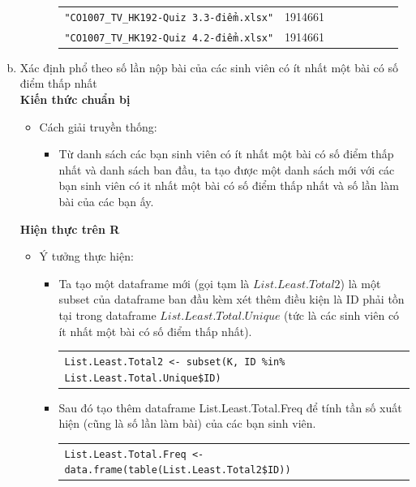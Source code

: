 \documentclass[a4paper]{article}
\theoremstyle{definition}
\begin{document}
\begin{enumerate}[a)]
\begin{itemize}
\begin{itemize}
\begin{center}
\begin{tabular}{l c c c c c c c}
                     \texttt{"CO1007\_TV\_HK192-Quiz 3.3-điểm.xlsx"} & 1914661\\
                     \texttt{"CO1007\_TV\_HK192-Quiz 4.2-điểm.xlsx"} & 1914661
                \end{tabular}
            \end{center}
        \end{itemize}
    \end{itemize}
    \bf\item {Xác định phổ theo số lần nộp bài của các sinh viên có ít nhất một bài có số điểm thấp nhất}\\[6pt]
    \bf Kiến thức chuẩn bị\normalfont
    \begin{itemize}
        \item Cách giải truyền thống:
        \begin{itemize}
            \item Từ danh sách các bạn sinh viên có ít nhất một bài có số điểm thấp nhất và danh sách ban đầu, ta tạo được một danh sách mới với các bạn sinh viên có it nhất một bài có số điểm thấp nhất và số lần làm bài của các bạn ấy.
        \end{itemize}
    \end{itemize}
    \bf Hiện thực trên R\normalfont
    \begin{itemize}
        \item Ý tưởng thực hiện:
        \begin{itemize}
            \item Ta tạo một dataframe mới (gọi tạm là $List.Least.Total2$) là một subset của dataframe ban đầu kèm xét thêm điều kiện là ID phải tồn tại trong dataframe $List.Least.Total.Unique$ (tức là các sinh viên có ít nhất một bài có số điểm thấp nhất).
            \begin{center}
                \begin{tabular}{p{13cm}}
                    \texttt{List.Least.Total2 <- subset(K, ID \%in\% List.Least.Total.Unique\$ID)}
                \end{tabular}
            \end{center}
            \item Sau đó tạo thêm dataframe List.Least.Total.Freq để tính tần số xuất hiện (cũng là số lần làm bài) của các bạn sinh viên.
            \begin{center}
                \begin{tabular}{p{13cm}}
                    \texttt{List.Least.Total.Freq <- data.frame(table(List.Least.Total2\$ID))}

\end{tabular}
\end{center}
\end{itemize}
\end{itemize}
\end{enumerate}
\end{document}

